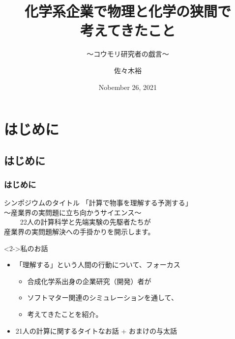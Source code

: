 \documentclass[12pt, dvipdfmx]{beamer}
\title
{化学系企業で物理と化学の狭間で\\考えてきたこと}
\subtitle{～コウモリ研究者の戯言～}
\author[東亞合成　佐々木]{佐々木裕}
\institute[東亞合成]{東亞合成}
\date{Nobember 26, 2021}
\begin{document}
\begin{frame}\frametitle{}
	\titlepage
\end{frame}
\section{はじめに}
\subsection{はじめに}
\begin{frame}
    \frametitle{はじめに}
    \begin{block}{シンポジウムのタイトル}
        「計算で物事を理解する予測する」\\
        ～産業界の実問題に立ち向かうサイエンス～\\

　　    22人の計算科学と先端実験の先駆者たちが\\産業界の実問題解決への手掛かりを開示します。
    \end{block}
    
    \begin{exampleblock}<2->{私のお話}
        \begin{itemize}
            \item 「理解する」という人間の行動について、フォーカス
            \begin{itemize}
                \item 合成化学系出身の企業研究（開発）者が
                \item ソフトマター関連のシミュレーションを通して、
                \item 考えてきたことを紹介。
            \end{itemize}
            \item<3> 21人の計算に関するタイトなお話 + \alert{おまけの与太話}
        \end{itemize}
    \end{exampleblock}
\end{frame}
\end{document}

